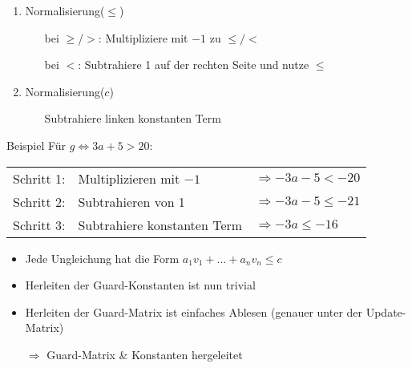 \begin{frame}
	\begin{enumerate}
		\item Normalisierung($\le$)
			\begin{itemize}
				\setlength{\itemindent}{.5in}
				\item[bei $\ge$/$>$:] Multipliziere mit $-1$ zu $\le/<$ 
				\item[bei $<$:] Subtrahiere 1 auf der rechten Seite und nutze $\le$
			\end{itemize}
		\item Normalisierung($c$)
			\begin{itemize}
				\setlength{\itemindent}{.5in}
				\item[] Subtrahiere linken konstanten Term  
			\end{itemize}
	\end{enumerate}
	\begin{exampleblock}{Beispiel}
		F\"ur $g \Leftrightarrow 3a+5>20$:
		\begin{tabular}{cll}
			Schritt 1: & Multiplizieren mit $-1$ & $\Rightarrow -3a-5 < -20$ \\
			Schritt 2: & Subtrahieren von 1 & $\Rightarrow -3a-5\le -21$ \\
			Schritt 3: & Subtrahiere konstanten Term & $\Rightarrow -3a \le -16$ \\
		\end{tabular}
	\end{exampleblock}
\end{frame}


\begin{frame} %
	\begin{itemize}
		\item Jede Ungleichung hat die Form $a_1 v_1 + \dots + a_n v_n \le c$
		\item Herleiten der Guard-Konstanten ist nun trivial
		\item Herleiten der Guard-Matrix ist einfaches Ablesen
		\hspace*{1.5cm}(genauer unter der Update-Matrix)
		\item[$\Rightarrow$] Guard-Matrix \& Konstanten hergeleitet \checkmark
	\end{itemize}
\end{frame}

